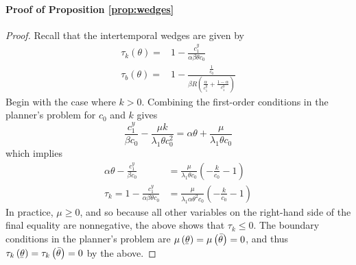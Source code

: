 \documentclass[11pt]{article}
\newcommand{\ubar}[1]{\underaccent{\bar}{#1}}
\begin{document}
\paragraph{Proof of Proposition \ref{prop:wedges}}
\begin{proof}
    Recall that the intertemporal wedges are given by 
\begin{align*}
\tau_{k}\left(\theta\right)= & 1-\frac{c_{1}^{y}}{\alpha\beta\theta c_{0}}\\
\tau_{b}\left(\theta\right)= & 1-\frac{\frac{1}{c_{0}}}{\beta R\left(\frac{\alpha}{c_{1}^{y}}+\frac{1-\alpha}{c_{1}^{0}}\right)}
\end{align*}
Begin with the case where $k>0$. Combining the first-order conditions
in the planner's problem for $c_{0}$ and $k$ gives 
\[
\frac{c_{1}^{y}}{\beta c_{0}}-\frac{\mu k}{\lambda_{1}\theta c_{0}^{2}}=\alpha\theta+\frac{\mu}{\lambda_{1}\theta c_{0}}
\]
which implies
\begin{align*}
\alpha\theta-\frac{c_{1}^{y}}{\beta c_{0}} & =\frac{\mu}{\lambda_{1}\theta c_{0}}\left(-\frac{k}{c_{0}}-1\right)\\
\tau_{k}=1-\frac{c_{1}^{y}}{\alpha\beta\theta c_{0}} & =\frac{\mu}{\lambda_{1}\alpha\theta^{2}c_{0}}\left(-\frac{k}{c_{0}}-1\right)
\end{align*}
In practice, \( \mu\ge 0 \), and so because all other variables on the right-hand side of the final equality are nonnegative, the above shows that $\tau_{k}\le0$. The boundary conditions in the planner's problem are \( \mu\left( \ubar{\theta} \right) = \mu\left( \bar{\theta} \right) = 0 \), and thus \( \tau_k\left( \ubar{\theta} \right) = \tau_k\left( \bar{\theta} \right) = 0 \) by the above. 


\end{proof}
\end{document}

